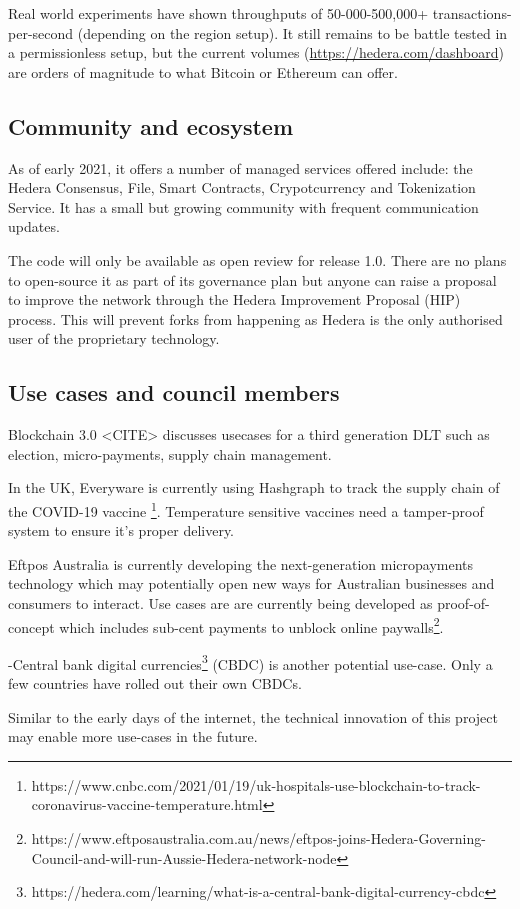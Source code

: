 Real world experiments have shown throughputs of 50-000-500,000+ transactions-per-second (depending on the region setup)\cite{baird2018hedera}. It still remains to be battle tested in a permissionless setup, but the current volumes (\url{https://hedera.com/dashboard}) are orders of magnitude to what Bitcoin or Ethereum can offer.

\subsection{Community and ecosystem}

As of early 2021, it offers a number of managed services offered include: the Hedera Consensus, File, Smart Contracts, Crypotcurrency and Tokenization Service. It has a small but growing community with frequent communication updates.

The code will only be available as open review for release 1.0. There are no plans to open-source it as part of its governance plan but anyone can raise a proposal to improve the network through the Hedera Improvement Proposal (HIP) process. This will prevent forks from happening as Hedera is the only authorised user of the proprietary technology. 

\subsection{Use cases and council members}

Blockchain 3.0 <CITE> discusses usecases for a third generation DLT such as election, micro-payments, supply chain management.

In the UK, Everyware is currently using Hashgraph to track the supply chain of the COVID-19 vaccine \footnote{https://www.cnbc.com/2021/01/19/uk-hospitals-use-blockchain-to-track-coronavirus-vaccine-temperature.html}. Temperature sensitive vaccines need a tamper-proof system to ensure it's proper delivery.

Eftpos Australia is currently developing the next-generation micropayments technology which may potentially open new ways for Australian businesses and consumers to interact. Use cases are are currently being developed as proof-of-concept which includes sub-cent payments to unblock online paywalls\footnote{https://www.eftposaustralia.com.au/news/eftpos-joins-Hedera-Governing-Council-and-will-run-Aussie-Hedera-network-node}.

-Central bank digital currencies\footnote{https://hedera.com/learning/what-is-a-central-bank-digital-currency-cbdc} (CBDC) is another potential use-case. Only a few countries have rolled out their own CBDCs.

Similar to the early days of the internet, the technical innovation of this project may enable more use-cases in the future.




